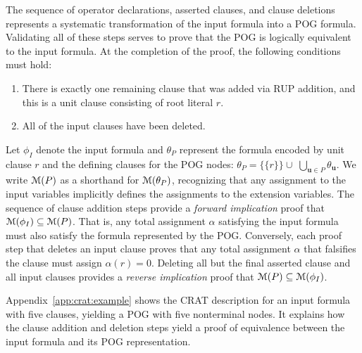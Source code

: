 \documentclass[letterpaper,USenglish,cleveref, autoref, thm-restate]{lipics-v2021}
\newcommand{\assign}{\alpha}
\newcommand{\modelset}{{\cal M}}
\newcommand{\inputformula}{\phi_I}
\newcommand{\pogformula}{\theta_P}
\newcommand{\makenode}[1]{\mathbf{#1}}
\newcommand{\nodeu}{\makenode{u}}
\begin{document}

The sequence of operator declarations, asserted clauses, and
clause deletions represents a systematic transformation of the input formula
into a POG formula.  Validating all of these steps serves to prove that the
POG is logically equivalent to the input formula.
At the completion of the proof, the following conditions must hold:
\begin{enumerate}
\item There is exactly one remaining clause that was added via RUP
  addition, and this is a unit clause consisting of root literal $r$.
\item All of the input clauses have been deleted.
\end{enumerate}
Let $\inputformula$ denote the input formula and $\pogformula$ represent the formula encoded by unit clause $r$ and the defining clauses for the POG nodes:
$\pogformula = \{\{r\}\} \cup \; \bigcup_{\nodeu \in P} \theta_{\nodeu}$.  We write $\modelset(P)$ as a shorthand for $\modelset(\pogformula)$, recognizing that
any assignment to the input variables implicitly defines the assignments to the extension variables.
The sequence of clause addition steps provide a {\em forward implication} proof that
$\modelset(\inputformula) \subseteq \modelset(P)$.  That is, any total
assignment $\assign$ satisfying the input formula must also satisfy
the formula represented by the POG\@.
Conversely,
each proof step that deletes an input clause proves that any
total assignment $\alpha$ that falsifies the clause must
assign $\assign(r) = 0$.  Deleting all but the final asserted clause and all input clauses provides a {\em reverse implication} proof
that
$\modelset(P) \subseteq \modelset(\inputformula)$.

Appendix~\ref{app:crat:example} shows the CRAT description for
an input formula with five clauses, yielding a POG with five
nonterminal nodes.  It explains how the clause addition and deletion
steps yield a proof of equivalence between the input formula and its POG
representation.
\end{document}
